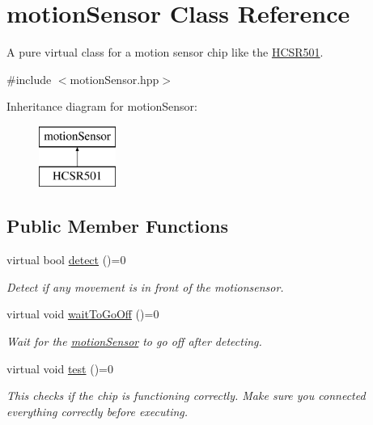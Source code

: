 \hypertarget{classmotion_sensor}{}\section{motion\+Sensor Class Reference}
\label{classmotion_sensor}


A pure virtual class for a motion sensor chip like the \mbox{\hyperlink{class_h_c_s_r501}{H\+C\+S\+R501}}.  




{\ttfamily \#include $<$motion\+Sensor.\+hpp$>$}

Inheritance diagram for motion\+Sensor\+:\begin{figure}[H]
\begin{center}
\leavevmode
\includegraphics[height=2.000000cm]{classmotion_sensor}
\end{center}
\end{figure}
\subsection*{Public Member Functions}
\begin{DoxyCompactItemize}
\item 
virtual bool \mbox{\hyperlink{classmotion_sensor_a0b8701a41516d8b1140c39474b1db9db}{detect}} ()=0
\begin{DoxyCompactList}\small\item\em Detect if any movement is in front of the motionsensor. \end{DoxyCompactList}\item 
virtual void \mbox{\hyperlink{classmotion_sensor_a855b7f86c8ef833bbcd2064a220a4b58}{wait\+To\+Go\+Off}} ()=0
\begin{DoxyCompactList}\small\item\em Wait for the \mbox{\hyperlink{classmotion_sensor}{motion\+Sensor}} to go off after detecting. \end{DoxyCompactList}\item 
virtual void \mbox{\hyperlink{classmotion_sensor_a718bb6e111adc734ce6e595e28664581}{test}} ()=0
\begin{DoxyCompactList}\small\item\em This checks if the chip is functioning correctly. Make sure you connected everything correctly before executing. \end{DoxyCompactList}\end{DoxyCompactItemize}


